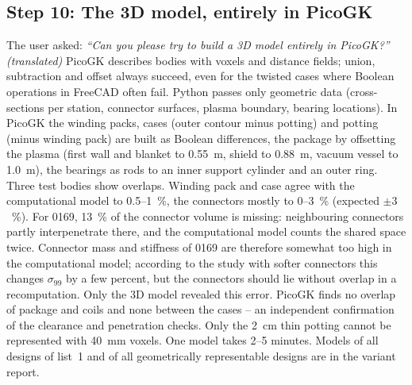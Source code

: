 \subsection*{Step 10: The 3D model, entirely in PicoGK}
The user asked: \emph{“Can you please try to build a 3D model entirely in PicoGK?” (translated)} PicoGK \cite{picogk}
describes bodies with voxels and distance fields; union, subtraction and offset always succeed, even for the twisted
cases where Boolean operations in FreeCAD often fail. Python passes only geometric data (cross-sections per station,
connector surfaces, plasma boundary, bearing locations). In PicoGK the winding packs, cases (outer contour minus
potting) and potting (minus winding pack) are built as Boolean differences, the package by offsetting the plasma
(first wall and blanket to \SI{0.55}{m}, shield to \SI{0.88}{m}, vacuum vessel to \SI{1.0}{m}), the bearings as rods
to an inner support cylinder and an outer ring. Three test bodies show overlaps.
Winding pack and case agree with the computational model to 0.5--1~\%, the connectors mostly to 0--3~\% (expected
$\pm3$~\%). For 0169, 13~\% of the connector volume is missing: neighbouring connectors partly interpenetrate there,
and the computational model counts the shared space twice. Connector mass and stiffness of 0169 are therefore
somewhat too high in the computational model; according to the study with softer connectors this changes
$\sigma_{99}$ by a few percent, but the connectors should lie without overlap in a recomputation. Only the 3D model
revealed this error. PicoGK finds no overlap of
package and coils and none between the cases -- an independent confirmation of the clearance and penetration checks.
Only the \SI{2}{cm} thin potting cannot be represented with \SI{40}{mm} voxels. One model takes 2--5 minutes. Models
of all designs of list~1 and of all geometrically representable designs are in the variant report.


